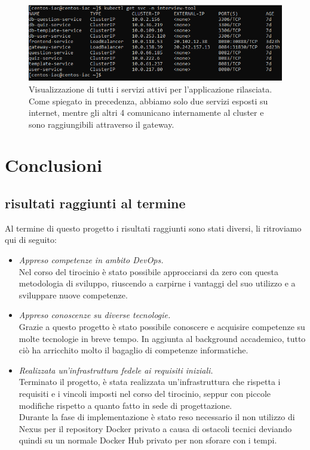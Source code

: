 \documentclass[a4paper,12pt]{report}
\begin{document}
\begin{figure}[h]
	\includegraphics[width=1.0\textwidth]{app_micro3}
    \caption{Visualizzazione di tutti i servizi attivi per l'applicazione rilasciata.\\Come spiegato in precedenza, abbiamo solo due servizi esposti su internet, mentre gli altri 4 comunicano internamente al cluster e sono raggiungibili attraverso il gateway.}
    \label{fig:app_micro3}
\end{figure}

\chapter{Conclusioni}
\section{risultati raggiunti al termine}
Al termine di questo progetto i risultati raggiunti sono stati diversi, li ritroviamo qui di seguito:\\
\begin{itemize}
\item \textit{Appreso competenze in ambito DevOps.}\\
Nel corso del tirocinio è stato possibile approcciarsi da zero con questa metodologia di sviluppo, riuscendo a carpirne i vantaggi del suo utilizzo e a sviluppare nuove competenze.\\
\item \textit{Appreso conoscenze su diverse tecnologie.}\\
Grazie a questo progetto è stato possibile conoscere e acquisire competenze su molte tecnologie in breve tempo. In aggiunta al background accademico, tutto ciò ha arricchito molto il bagaglio di competenze informatiche.\\
\item \textit{Realizzata un'infrastruttura fedele ai requisiti iniziali.}\\
Terminato il progetto, è stata realizzata un'infrastruttura che rispetta i requisiti e i vincoli imposti nel corso del tirocinio, seppur con piccole modifiche rispetto a quanto fatto in sede di progettazione.\\
Durante la fase di implementazione è stato reso necessario il non utilizzo di Nexus per il repository Docker privato a causa di ostacoli tecnici deviando quindi su un normale Docker Hub privato per non sforare con i tempi.
\end{itemize}
\end{document}
